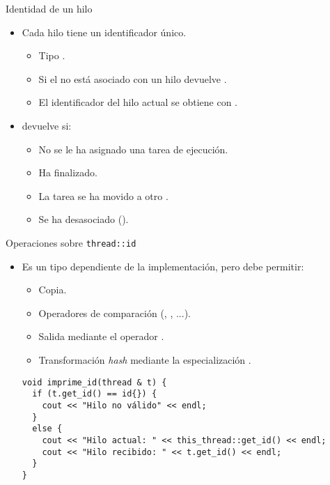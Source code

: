 \begin{frame}[t]{Identidad de un hilo}
\begin{itemize}
  \item Cada hilo tiene un identificador único.
    \begin{itemize}
      \item Tipo .
      \item Si el  no está asociado con un hilo  devuelve .
      \item El identificador del hilo actual se obtiene con .
    \end{itemize}

  \item {} devuelve  si:
    \begin{itemize}
      \item No se le ha asignado una tarea de ejecución.
      \item Ha finalizado.
      \item La tarea se ha movido a otro .
      \item Se ha desasociado ().
    \end{itemize}
\end{itemize}
\end{frame}

\begin{frame}[t,fragile]{Operaciones sobre \texttt{thread::id}}
\begin{itemize}
  \item Es un tipo dependiente de la implementación, pero debe permitir:
    \begin{itemize}
      \item Copia.
      \item Operadores de comparación (\cppid{==}, \cppid{<}, ...).
      \item Salida mediante el operador \cppid{<{}<}.
      \item Transformación \emph{hash} mediante la especialización .
    \end{itemize}
\begin{lstlisting}
void imprime_id(thread & t) {
  if (t.get_id() == id{}) {
    cout << "Hilo no válido" << endl;
  }
  else {
    cout << "Hilo actual: " << this_thread::get_id() << endl;
    cout << "Hilo recibido: " << t.get_id() << endl;
  }
}
\end{lstlisting}
\end{itemize}
\end{frame}

